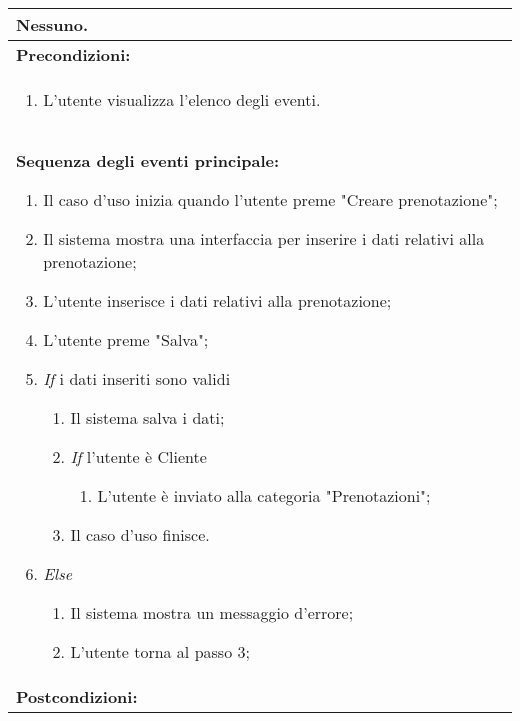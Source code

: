 \documentclass{article}
\begin{document}
\begin{table}[t]
\begin{tabular}{|p{\linewidth}|}
        Nessuno. \\
        \hline
        \cellcolor{gray!20}
        \textbf{Precondizioni:} \\
        \cellcolor{gray!20}
        \begin{minipage}{\linewidth}
            \begin{enumerate}[noitemsep]
                \item L'utente visualizza l'elenco degli eventi. %
            \end{enumerate}
        \end{minipage} \\
        \hline
        \textbf{Sequenza degli eventi principale:}
        \begin{enumerate}
            \item Il caso d'uso inizia quando l'utente preme "Creare prenotazione";
            \item Il sistema mostra una interfaccia per inserire i dati relativi alla prenotazione;
            \item L'utente inserisce i dati relativi alla prenotazione; 
            \item L'utente preme "Salva";
            \item \textit{If} i dati inseriti sono validi
            \begin{enumerate}
                \item Il sistema salva i dati;
                \item \textit{If} l'utente è Cliente
                \begin{enumerate}
                    \item L'utente è inviato alla categoria "Prenotazioni";
                \end{enumerate}
                \item Il caso d'uso finisce.
            \end{enumerate}
            \item \textit{Else}
            \begin{enumerate}
                \item Il sistema mostra un messaggio d'errore;
                \item L'utente torna al passo 3;
            \end{enumerate}
        \end{enumerate} \\
        \hline
        \cellcolor{gray!20}
        \textbf{Postcondizioni:} \\

\end{tabular}
\end{table}
\end{document}

